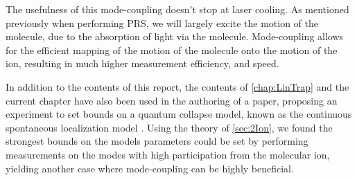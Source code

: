 The usefulness of this mode-coupling doesn't stop at laser cooling. As mentioned previously when performing PRS, we will largely excite the motion of the molecule, due to the absorption of light via the molecule. Mode-coupling allows for the efficient mapping of the motion of the molecule onto the motion of the ion, resulting in much higher measurement efficiency, and speed.


In addition to the contents of this report, the contents of \cref{chap:LinTrap} and the current chapter have also been used in the authoring of a paper, proposing an experiment to set bounds on a quantum collapse model, known as the continuous spontaneous localization model \cite{lenlereriksen2023testing}. Using the theory of \cref{sec:2Ion}, we found the strongest bounds on the models parameters could be set by performing measurements on the modes with high participation from the molecular ion, yielding another case where mode-coupling can be highly beneficial.
